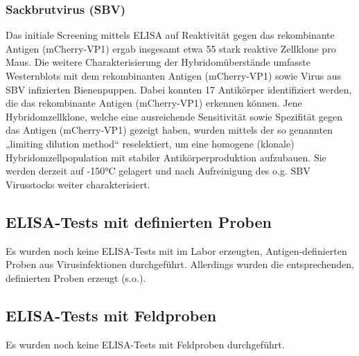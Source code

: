 \subsubsection{Sackbrutvirus (SBV)}
Das initiale Screening mittels ELISA auf Reaktivität gegen das rekombinante Antigen (mCherry-VP1) ergab insgesamt etwa 55 stark reaktive Zellklone pro Maus. 
Die weitere Charakterisierung der Hybridomüberstände umfasste Westernblots mit dem rekombinanten Antigen (mCherry-VP1) sowie Virus aus SBV infizierten Bienenpuppen. Dabei konnten 17 Antikörper identifiziert werden, die das rekombinante Antigen (mCherry-VP1) erkennen können. Jene Hybridomzellklone, welche eine ausreichende Sensitivität sowie Spezifität gegen das Antigen (mCherry-VP1) gezeigt haben, wurden mittels der so genannten „limiting dilution method“ reselektiert, um eine homogene (klonale) Hybridomzellpopulation mit stabiler Antikörperproduktion aufzubauen. Sie werden derzeit auf -150°C gelagert und nach Aufreinigung des o.g. SBV Virusstocks weiter charakterisiert. 

\subsection{ELISA-Tests mit definierten Proben}
Es wurden noch keine ELISA-Tests mit im Labor erzeugten, Antigen-definierten Proben aus Virusinfektionen durchgeführt. Allerdings wurden die entsprechenden, definierten Proben erzeugt (s.o.).

\subsection{ELISA-Tests mit Feldproben}
Es wurden noch keine ELISA-Tests mit Feldproben durchgeführt.

















